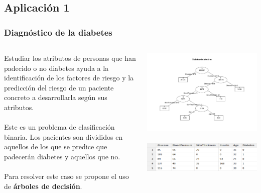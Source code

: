 \documentclass[8pt]{beamer}
\begin{document}
  \subsection{Aplicación 1}
    \begin{frame}
      \frametitle{Diagnóstico de la diabetes}
      \begin{columns}[T]
       \begin{column}{.5\textwidth}
	 \justifying
	 Estudiar los atributos de personas que han padecido o no diabetes ayuda a
         la identificación de los factores de riesgo y la
         predicción del riesgo de un paciente concreto a desarrollarla según sus atributos.
         \\~\\
         Este es un problema de clasificación binaria. Los pacientes son divididos en aquellos
         de los que se predice que padecerán diabetes y aquellos que no.
         \\~\\
         Para resolver este caso se propone el uso de \textbf{árboles de decisión}. 
         
       \end{column}
       \begin{column}{.5\textwidth}
	  \begin{center}
	  \includegraphics[width=\textwidth]{imgs/tree.pdf} %
	  \\~\\
	  \includegraphics[width=\textwidth]{imgs/pima-indians-diabetes.png} %

	  \end{center}
       \end{column}
      \end{columns}
    \end{frame}
    
\end{document}
